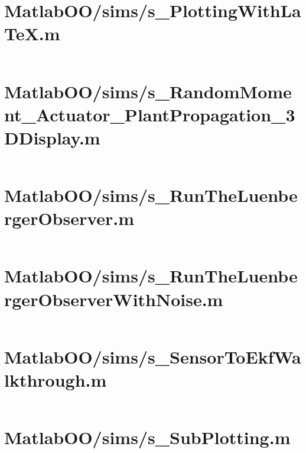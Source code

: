 \pagebreak
\section*{MatlabOO/sims/s\_PlottingWithLaTeX.m}\label{code:MatlabOO/sims/s_PlottingWithLaTeX.m}
\inputminted[linenos,fontsize=\scriptsize]{matlab}{/home/dcouture/git/mathyourlife/TSatPy/beta_versions/matlab_object_oriented/sims/s_PlottingWithLaTeX.m}

\pagebreak
\section*{MatlabOO/sims/s\_RandomMoment\_Actuator\_PlantPropagation\_3DDisplay.m}\label{code:MatlabOO/sims/s_RandomMoment_Actuator_PlantPropagation_3DDisplay.m}
\inputminted[linenos,fontsize=\scriptsize]{matlab}{/home/dcouture/git/mathyourlife/TSatPy/beta_versions/matlab_object_oriented/sims/s_RandomMoment_Actuator_PlantPropagation_3DDisplay.m}

\pagebreak
\section*{MatlabOO/sims/s\_RunTheLuenbergerObserver.m}\label{code:MatlabOO/sims/s_RunTheLuenbergerObserver.m}
\inputminted[linenos,fontsize=\scriptsize]{matlab}{/home/dcouture/git/mathyourlife/TSatPy/beta_versions/matlab_object_oriented/sims/s_RunTheLuenbergerObserver.m}

\pagebreak
\section*{MatlabOO/sims/s\_RunTheLuenbergerObserverWithNoise.m}\label{code:MatlabOO/sims/s_RunTheLuenbergerObserverWithNoise.m}
\inputminted[linenos,fontsize=\scriptsize]{matlab}{/home/dcouture/git/mathyourlife/TSatPy/beta_versions/matlab_object_oriented/sims/s_RunTheLuenbergerObserverWithNoise.m}

\pagebreak
\section*{MatlabOO/sims/s\_SensorToEkfWalkthrough.m}\label{code:MatlabOO/sims/s_SensorToEkfWalkthrough.m}
\inputminted[linenos,fontsize=\scriptsize]{matlab}{/home/dcouture/git/mathyourlife/TSatPy/beta_versions/matlab_object_oriented/sims/s_SensorToEkfWalkthrough.m}

\pagebreak
\section*{MatlabOO/sims/s\_SubPlotting.m}\label{code:MatlabOO/sims/s_SubPlotting.m}
\inputminted[linenos,fontsize=\scriptsize]{matlab}{/home/dcouture/git/mathyourlife/TSatPy/beta_versions/matlab_object_oriented/sims/s_SubPlotting.m}

